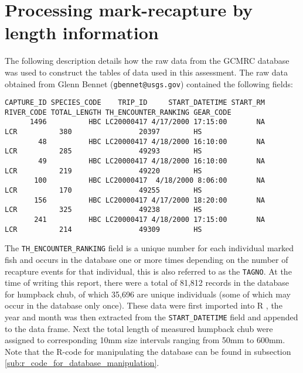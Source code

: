 \section{Processing mark-recapture by length information} %
\label{sec:processing_mark_recapture_by_length_information}

The following description details how the raw data from the GCMRC database was used to construct the tables of data used in this assessment. The raw data obtained from Glenn Bennet (\texttt{gbennet@usgs.gov}) contained the following fields:
\begin{scriptsize}
\begin{verbatim}
CAPTURE_ID SPECIES_CODE    TRIP_ID     START_DATETIME START_RM RIVER_CODE TOTAL_LENGTH TH_ENCOUNTER_RANKING GEAR_CODE
      1496          HBC LC20000417 4/17/2000 17:15:00       NA        LCR          380                20397        HS
        48          HBC LC20000417 4/18/2000 16:10:00       NA        LCR          285                49293        HS
        49          HBC LC20000417 4/18/2000 16:10:00       NA        LCR          219                49220        HS
       100          HBC LC20000417  4/18/2000 8:06:00       NA        LCR          170                49255        HS
       156          HBC LC20000417 4/17/2000 18:20:00       NA        LCR          325                49238        HS
       241          HBC LC20000417 4/18/2000 17:15:00       NA        LCR          214                49309        HS
\end{verbatim}
\end{scriptsize}
The \verb"TH_ENCOUNTER_RANKING" field is a unique number for each individual marked fish and occurs in the database one or more times depending on the number of recapture events for that individual, this is also referred to as the \verb"TAGNO".  At the time of writing this report, there were a total of 81,812 records in the database for humpback chub, of which 35,696 are unique individuals (some of which may occur in the database only once).  These data were first imported into R \citep{R-Development-Core-Team:2009fk}, the year and month was then extracted from the \verb"START_DATETIME" field and appended to the data frame.  Next the total length of measured humpback chub were assigned to corresponding 10mm size intervals ranging from 50mm to 600mm.  Note that the R-code for manipulating the database can be found in subsection \ref{sub:r_code_for_database_manipulation}.

